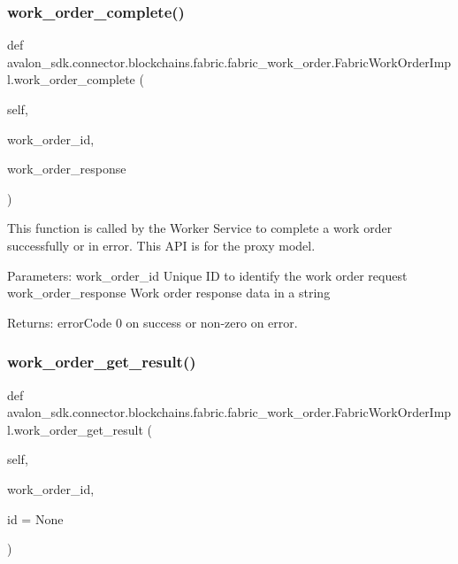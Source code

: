 \subsubsection{\texorpdfstring{work\+\_\+order\+\_\+complete()}{work\_order\_complete()}}
{\footnotesize\ttfamily def avalon\+\_\+sdk.\+connector.\+blockchains.\+fabric.\+fabric\+\_\+work\+\_\+order.\+Fabric\+Work\+Order\+Impl.\+work\+\_\+order\+\_\+complete (\begin{DoxyParamCaption}\item[{}]{self,  }\item[{}]{work\+\_\+order\+\_\+id,  }\item[{}]{work\+\_\+order\+\_\+response }\end{DoxyParamCaption})}

\begin{DoxyVerb}This function is called by the Worker Service to
complete a work order successfully or in error.
This API is for the proxy model.

Parameters:
work_order_id       Unique ID to identify the work order request
work_order_response Work order response data in a string

Returns:
errorCode           0 on success or non-zero on error.
\end{DoxyVerb}
 \mbox{\label{classavalon__sdk_1_1connector_1_1blockchains_1_1fabric_1_1fabric__work__order_1_1FabricWorkOrderImpl_a7e75472152118a477573eb79282aa1c0}} 
\subsubsection{\texorpdfstring{work\+\_\+order\+\_\+get\+\_\+result()}{work\_order\_get\_result()}}
{\footnotesize\ttfamily def avalon\+\_\+sdk.\+connector.\+blockchains.\+fabric.\+fabric\+\_\+work\+\_\+order.\+Fabric\+Work\+Order\+Impl.\+work\+\_\+order\+\_\+get\+\_\+result (\begin{DoxyParamCaption}\item[{}]{self,  }\item[{}]{work\+\_\+order\+\_\+id,  }\item[{}]{id = {\ttfamily None} }\end{DoxyParamCaption})}

